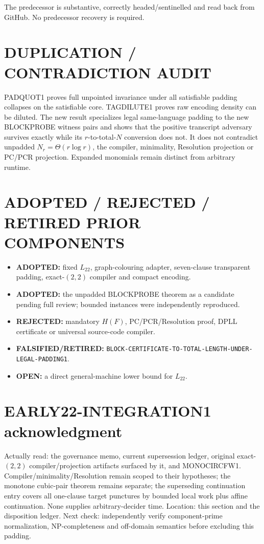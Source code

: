 \documentclass[11pt]{article}
\newcommand{\Ltwo}{L_{22}}
\begin{document}
The predecessor
is substantive, correctly headed/sentinelled and read back from GitHub. No
predecessor recovery is required.

\section{DUPLICATION / CONTRADICTION AUDIT}
PADQUOT1 proves full unpointed invariance under all satisfiable padding
collapses on the satisfiable core. TAGDILUTE1 proves raw encoding density can
be diluted. The new result specializes legal same-language padding to the
new BLOCKPROBE witness pairs and shows that the positive transcript adversary
survives exactly while its $r$-to-total-$N$ conversion does not. It does not
contradict unpadded $N_r=\Theta(r\log r)$, the compiler, minimality,
Resolution projection or PC/PCR projection. Expanded monomials remain
distinct from arbitrary runtime.

\section{ADOPTED / REJECTED / RETIRED PRIOR COMPONENTS}
\begin{itemize}[leftmargin=*]
\item \textbf{ADOPTED:} fixed \(\Ltwo\), graph-colouring adapter,
seven-clause transparent padding, exact-$(2,2)$ compiler and compact encoding.
\item \textbf{ADOPTED:} the unpadded BLOCKPROBE theorem as a candidate pending
full review; bounded instances were independently reproduced.
\item \textbf{REJECTED:} mandatory $H(F)$, PC/PCR/Resolution proof, DPLL
certificate or universal source-code compiler.
\item \textbf{FALSIFIED/RETIRED:}
\texttt{BLOCK-CERTIFICATE-TO-TOTAL-LENGTH-UNDER-LEGAL-PADDING1}.
\item \textbf{OPEN:} a direct general-machine lower bound for \(\Ltwo\).
\end{itemize}

\section{EARLY22-INTEGRATION1 acknowledgment}
Actually read: the governance memo, current supersession ledger, original
exact-$(2,2)$ compiler/projection artifacts surfaced by it, and MONOCIRCFW1.
Compiler/minimality/Resolution remain scoped to their hypotheses; the
monotone cubic-pair theorem remains separate; the superseding continuation
entry covers all one-clause target punctures by bounded local work plus affine
continuation. None supplies arbitrary-decider time. Location: this section
and the disposition ledger. Next check: independently verify component-prime
normalization, NP-completeness and off-domain semantics before excluding this
padding.
\end{document}
